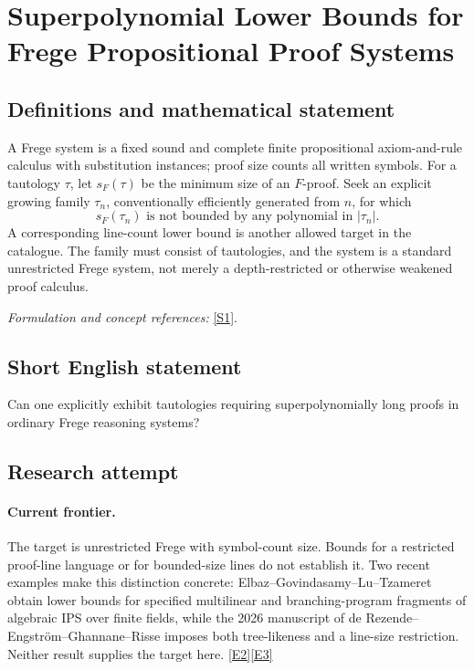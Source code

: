 \documentclass[11pt,a4paper]{article}
\newcommand{\sref}[2]{\hyperlink{source:#1:#2}{[S#2]}}
\newcommand{\eref}[2]{\hyperlink{extra:#1:#2}{[E#2]}}
\newif\ifshowcatalogue
\newcommand{\cataloguescope}[1]{\ifshowcatalogue
 \paragraph{Exact scope in the supplied catalogue.}
 \begin{quote}\small #1\end{quote}\fi}
\numberwithin{equation}{section}
\begin{document}
\setcounter{section}{0}
\clearpage
\section*{\texorpdfstring{Superpolynomial Lower Bounds for Frege Propositional Proof Systems}{Superpolynomial Lower Bounds for Frege Propositional Proof Systems}}\label{30006730}
\subsection{Definitions and mathematical statement}
A Frege system is a fixed sound and complete finite propositional axiom-and-rule calculus with substitution instances; proof size counts all written symbols. For a tautology $\tau$, let $s_F(\tau)$ be the minimum size of an $F$-proof. Seek an explicit growing family $\tau_n$, conventionally efficiently generated from $n$, for which
\[
 s_F(\tau_n)\text{ is not bounded by any polynomial in }|\tau_n|.
\]
A corresponding line-count lower bound is another allowed target in the catalogue. The family must consist of tautologies, and the system is a standard unrestricted Frege system, not merely a depth-restricted or otherwise weakened proof calculus.
\par\smallskip\textit{Formulation and concept references:} \sref{30006730}{1}.
\cataloguescope{Prove a superpolynomial lower bound on the size, or number of lines, of proofs in standard Frege propositional proof systems for an explicit family of propositional tautologies.}
\subsection{Short English statement}
Can one explicitly exhibit tautologies requiring superpolynomially long proofs in ordinary Frege reasoning systems?
\subsection{Research attempt}

\paragraph{Current frontier.}
The target is unrestricted Frege with symbol-count size. Bounds for a
restricted proof-line language or for bounded-size lines do not establish it.
Two recent examples make this distinction concrete: Elbaz--Govindasamy--Lu--Tzameret
obtain lower bounds for specified multilinear and branching-program fragments
of algebraic IPS over finite fields, while the 2026 manuscript of
de Rezende--Engstr\"om--Ghannane--Risse imposes both tree-likeness and a line-size
restriction. Neither result supplies the target here.
\eref{30006730}{2}\eref{30006730}{3}
\end{document}

